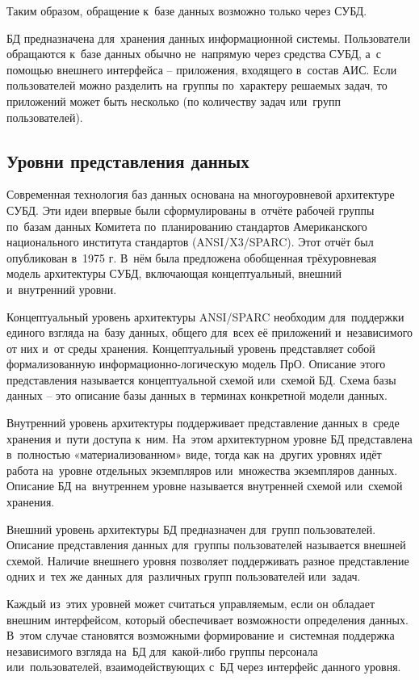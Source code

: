 \documentclass{ou}
\begin{document}
Таким образом, обращение к~базе данных возможно только через СУБД.

БД предназначена для~хранения данных информационной системы. Пользователи обращаются к~базе данных обычно не~напрямую через средства СУБД, а~с помощью внешнего интерфейса -- приложения, входящего в~состав АИС. Если пользователей можно разделить на~группы по~характеру решаемых задач, то приложений может быть несколько (по количеству задач или~групп пользователей). 

\subsection{Уровни представления данных}
Современная технология баз данных основана на многоуровневой архитектуре СУБД. Эти идеи впервые были сформулированы в~отчёте рабочей группы по~базам данных Комитета по~планированию стандартов Американского национального института стандартов (ANSI/X3/SPARC). Этот отчёт был опубликован в~1975 г. В~нём была предложена обобщенная трёхуровневая модель архитектуры СУБД, включающая концептуальный, внешний и~внутренний уровни.

Концептуальный уровень архитектуры ANSI/SPARC необходим для~поддержки единого взгляда на~базу данных, общего для~всех её приложений и~независимого от них и~от среды хранения. Концептуальный уровень представляет собой формализованную информационно-логическую модель ПрО. Описание этого представления называется концептуальной схемой или~схемой БД. Схема базы данных -- это описание базы данных в~терминах конкретной модели данных\cite{Elmudurov2023}.

Внутренний уровень архитектуры поддерживает представление данных в~среде хранения и~пути доступа к~ним. На~этом архитектурном уровне БД представлена в~полностью «материализованном» виде, тогда как на~других уровнях идёт работа на~уровне отдельных экземпляров или~множества экземпляров данных. Описание БД на~внутреннем уровне называется внутренней схемой или~схемой хранения.

Внешний уровень архитектуры БД предназначен для~групп пользователей. Описание представления данных для~группы пользователей называется внешней схемой. Наличие внешнего уровня позволяет поддерживать разное представление одних и~тех же данных для~различных групп пользователей или~задач.

Каждый из~этих уровней может считаться управляемым, если он обладает внешним интерфейсом, который обеспечивает возможности определения данных. В~этом случае становятся возможными формирование и~системная поддержка независимого взгляда на~БД для~какой-либо группы персонала или~пользователей, взаимодействующих с~БД через интерфейс данного уровня\cite{Sergeev2012}.
\end{document}
